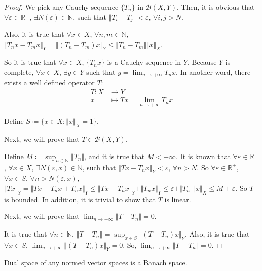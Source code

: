 \begin{proof}
We pick any Cauchy sequence $\{T_n\}$ in $\mathcal{B}(X, Y)$. Then, it is obvious that $\forall \varepsilon \in \mathbb{R}^+$, $\exists N(\varepsilon) \in \mathbb{N}$, such that $\Vert T_i - T_j \Vert < \varepsilon$, $\forall i, j > N$.

Also, it is true that $\forall x \in X$, $\forall n, m \in \mathbb{N}$, $\Vert T_n x - T_m x \Vert_{Y} = \Vert (T_n - T_m) x \Vert_{Y} \leq \Vert T_n - T_m \Vert \Vert x \Vert_{X}$. 

So it is true that $\forall x \in X$, $\{T_n x\}$ is a Cauchy sequence in $Y$. Because $Y$ is complete, $\forall x \in X$, $\exists y \in Y$ such that $y = \lim_{n \to +\infty} T_n x$. In another word, there exists a well defined operator $T$: 
\begin{align*}
T \colon X &\to Y \\
x &\mapsto T x = \lim_{n \to +\infty} T_n x
\end{align*}

Define $S \coloneqq \{x \in X \colon \Vert x \Vert_{X} = 1\}$. 

Next, we will prove that $T \in \mathcal{B}(X, Y)$. 

Define $M \coloneqq \sup_{n \in \mathbb{N}} \Vert T_n \Vert$, and it is true that $M < +\infty$. It is known that $\forall \varepsilon \in \mathbb{R}^+$, $\forall x \in X$, $\exists N(\varepsilon, x) \in \mathbb{N}$, such that $\Vert T x - T_n x \Vert_{Y} < \varepsilon$, $\forall n > N$. So $\forall \varepsilon \in \mathbb{R}^+$, $\forall x \in S$, $\forall n > N(\varepsilon, x)$, $\Vert T x \Vert_{Y} = \Vert T x - T_n x + T_n x \Vert_{Y} \leq \Vert T x - T_n x \Vert_{Y} + \Vert T_n x \Vert_{Y} \leq \varepsilon + \Vert T_n \Vert \Vert x \Vert_{X} \leq M + \varepsilon$. So $T$ is bounded. In addition, it is trivial to show that $T$ is linear. 

Next, we will prove that $\lim_{n \to +\infty} \Vert T - T_n \Vert = 0$.

It is true that $\forall n \in \mathbb{N}$, $\Vert T - T_n \Vert_{} = \sup_{x \in S} \Vert (T - T_n)x \Vert_{Y}$. Also, it is true that $\forall x \in S$, $\lim_{n \to +\infty} \Vert (T - T_n)x \Vert_{Y} = 0$. So, $\lim_{n \to +\infty} \Vert T - T_n \Vert = 0$.
\end{proof}

\begin{corollary}
Dual space of any normed vector spaces is a Banach space.
\end{corollary}

